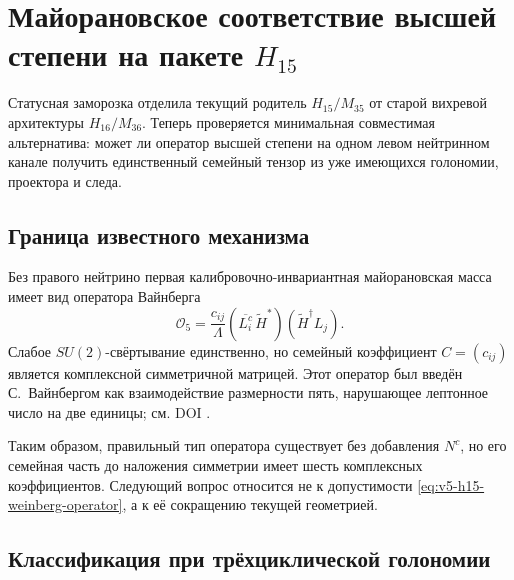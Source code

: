 \chapter{Майорановское соответствие высшей степени на пакете \texorpdfstring{$H_{15}$}{H15}}

Статусная заморозка отделила текущий родитель $H_{15}/M_{35}$ от старой
вихревой архитектуры $H_{16}/M_{36}$. Теперь проверяется минимальная
совместимая альтернатива: может ли оператор высшей степени на одном левом
нейтринном канале получить единственный семейный тензор из уже имеющихся
голономии, проектора и следа.

\section{Граница известного механизма}

Без правого нейтрино первая калибровочно-инвариантная майорановская масса
имеет вид оператора Вайнберга
\begin{equation}
 \mathcal O_5=
 \frac{c_{ij}}{\Lambda}
 (\overline{L_i^c}\,\widetilde H^*)
 (\widetilde H^\dagger L_j).
 \label{eq:v5-h15-weinberg-operator}
\end{equation}
Слабое $SU(2)$-свёртывание единственно, но семейный коэффициент
$C=(c_{ij})$ является комплексной симметричной матрицей. Этот оператор был
введён С.~Вайнбергом как взаимодействие размерности пять, нарушающее
лептонное число на две единицы; см. DOI
.

Таким образом, правильный тип оператора существует без добавления $N^c$,
но его семейная часть до наложения симметрии имеет шесть комплексных
коэффициентов. Следующий вопрос относится не к допустимости
\eqref{eq:v5-h15-weinberg-operator}, а к её сокращению текущей геометрией.

\section{Классификация при трёхциклической голономии}

